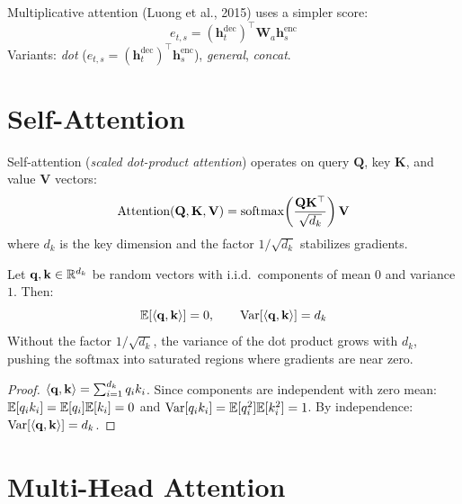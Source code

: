 \begin{definition}
Multiplicative attention (Luong et al., 2015) uses a simpler score:
\[
e_{t,s} = (\mathbf{h}_t^{\text{dec}})^\top \mathbf{W}_a \mathbf{h}_s^{\text{enc}}
\]
Variants: \emph{dot} ($e_{t,s} = (\mathbf{h}_t^{\text{dec}})^\top \mathbf{h}_s^{\text{enc}}$),
\emph{general}, \emph{concat}.
\end{definition}

\section{Self-Attention}
\label{sec:att:selfattention}

\begin{definition}
Self-attention (\emph{scaled dot-product attention}) operates on query
$\mathbf{Q}$, key $\mathbf{K}$, and value $\mathbf{V}$ vectors:
\[
\text{Attention}(\mathbf{Q}, \mathbf{K}, \mathbf{V}) = \operatorname{softmax}\!\left(\frac{\mathbf{Q}\mathbf{K}^\top}{\sqrt{d_k}}\right) \mathbf{V}
\]
where $d_k$ is the key dimension and the factor $1/\sqrt{d_k}$ stabilizes
gradients.
\end{definition}

\begin{theorem}
Let $\mathbf{q}, \mathbf{k} \in \mathbb{R}^{d_k}$ be random vectors with i.i.d.\
components of mean $0$ and variance $1$. Then:
\[
\mathbb{E}[\langle \mathbf{q}, \mathbf{k} \rangle] = 0, \qquad \text{Var}[\langle \mathbf{q}, \mathbf{k} \rangle] = d_k
\]
Without the factor $1/\sqrt{d_k}$, the variance of the dot product grows with
$d_k$, pushing the softmax into saturated regions where gradients are near zero.
\end{theorem}

\begin{proof}
$\langle \mathbf{q}, \mathbf{k} \rangle = \sum_{i=1}^{d_k} q_i k_i$. Since
components are independent with zero mean:
$\mathbb{E}[q_i k_i] = \mathbb{E}[q_i]\mathbb{E}[k_i] = 0$ and
$\text{Var}[q_i k_i] = \mathbb{E}[q_i^2]\mathbb{E}[k_i^2] = 1$. By independence:
$\text{Var}[\langle \mathbf{q}, \mathbf{k} \rangle] = d_k$.
\end{proof}

\section{Multi-Head Attention}
\label{sec:att:multihead}

